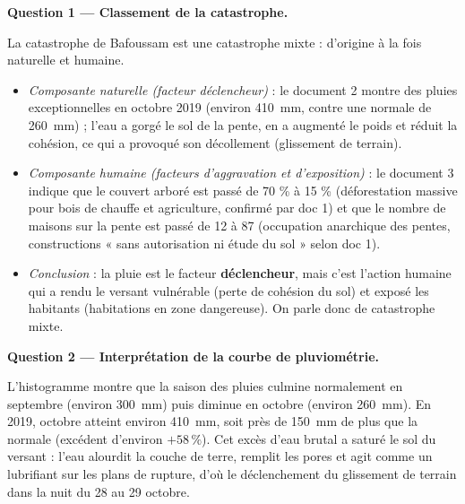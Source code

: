 \documentclass[11pt]{article}
\newcommand{\cle}[1]{{\popxbold\color{popdark}#1}}
\newcounter{popsec}
\newcounter{popsub}
\newcommand{\courssub}[1]{%
  \stepcounter{popsub}%
  \par\vspace{9pt}\noindent{\popxbold\fontsize{11.5}{13}\selectfont\color{popink}{\color{poporange}\thepopsec.\thepopsub}\hspace{6pt}#1}\par\nopagebreak\vspace{4pt}
}
\begin{document}
\courssub{Démarche et corrigé commenté}

\begin{exoresolu}
\textbf{Question 1 — Classement de la catastrophe.}\par
La catastrophe de Bafoussam est une catastrophe \cle{mixte} : d'origine à la fois naturelle et humaine.
\begin{itemize}
\item \emph{Composante naturelle (facteur déclencheur)} : le document 2 montre des pluies exceptionnelles en octobre 2019 (environ \SI{410}{mm}, contre une normale de \SI{260}{mm}) ; l'eau a gorgé le sol de la pente, en a augmenté le poids et réduit la cohésion, ce qui a provoqué son décollement (glissement de terrain).
\item \emph{Composante humaine (facteurs d'aggravation et d'exposition)} : le document 3 indique que le couvert arboré est passé de 70 \% à 15 \% (déforestation massive pour bois de chauffe et agriculture, confirmé par doc 1) et que le nombre de maisons sur la pente est passé de 12 à 87 (occupation anarchique des pentes, constructions « sans autorisation ni étude du sol » selon doc 1).
\item \emph{Conclusion} : la pluie est le facteur \textbf{déclencheur}, mais c'est l'action humaine qui a rendu le versant vulnérable (perte de cohésion du sol) et exposé les habitants (habitations en zone dangereuse). On parle donc de catastrophe mixte.
\end{itemize}

\tcblower

\textbf{Question 2 — Interprétation de la courbe de pluviométrie.}\par
L'histogramme montre que la saison des pluies culmine normalement en septembre (environ \SI{300}{mm}) puis diminue en octobre (environ \SI{260}{mm}). En 2019, octobre atteint environ \SI{410}{mm}, soit près de \SI{150}{mm} de plus que la normale (excédent d'environ $+58\,\%$). Cet excès d'eau brutal a saturé le sol du versant : l'eau alourdit la couche de terre, remplit les pores et agit comme un lubrifiant sur les plans de rupture, d'où le déclenchement du glissement de terrain dans la nuit du 28 au 29 octobre.


\end{exoresolu}
\end{document}
